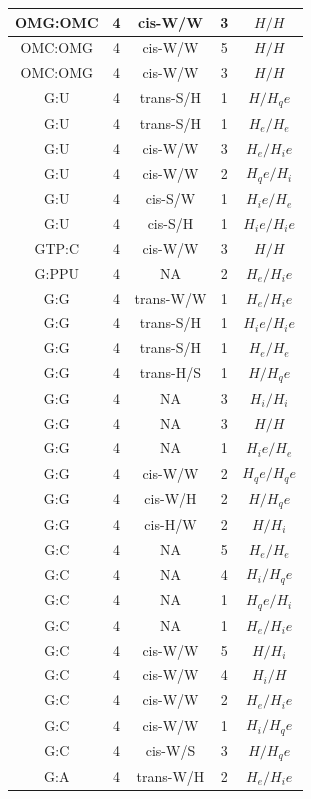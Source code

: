\begin{center}
\begin{longtable}{c|c|c|c|c}
OMG:OMC & 4 & cis-W/W & 3 & $H/H$ \\  \hline
OMC:OMG & 4 & cis-W/W & 5 & $H/H$ \\  \hline
OMC:OMG & 4 & cis-W/W & 3 & $H/H$ \\  \hline
G:U & 4 & trans-S/H & 1 & $H/H_qe$ \\  \hline
G:U & 4 & trans-S/H & 1 & $H_e/H_e$ \\  \hline
G:U & 4 & cis-W/W & 3 & $H_e/H_ie$ \\  \hline
G:U & 4 & cis-W/W & 2 & $H_qe/H_i$ \\  \hline
G:U & 4 & cis-S/W & 1 & $H_ie/H_e$ \\  \hline
G:U & 4 & cis-S/H & 1 & $H_ie/H_ie$ \\  \hline
GTP:C & 4 & cis-W/W & 3 & $H/H$ \\  \hline
G:PPU & 4 & NA & 2 & $H_e/H_ie$ \\  \hline
G:G & 4 & trans-W/W & 1 & $H_e/H_ie$ \\  \hline
G:G & 4 & trans-S/H & 1 & $H_ie/H_ie$ \\  \hline
G:G & 4 & trans-S/H & 1 & $H_e/H_e$ \\  \hline
G:G & 4 & trans-H/S & 1 & $H/H_qe$ \\  \hline
G:G & 4 & NA & 3 & $H_i/H_i$ \\  \hline
G:G & 4 & NA & 3 & $H/H$ \\  \hline
G:G & 4 & NA & 1 & $H_ie/H_e$ \\  \hline
G:G & 4 & cis-W/W & 2 & $H_qe/H_qe$ \\  \hline
G:G & 4 & cis-W/H & 2 & $H/H_qe$ \\  \hline
G:G & 4 & cis-H/W & 2 & $H/H_i$ \\  \hline
G:C & 4 & NA & 5 & $H_e/H_e$ \\  \hline
G:C & 4 & NA & 4 & $H_i/H_qe$ \\  \hline
G:C & 4 & NA & 1 & $H_qe/H_i$ \\  \hline
G:C & 4 & NA & 1 & $H_e/H_ie$ \\  \hline
G:C & 4 & cis-W/W & 5 & $H/H_i$ \\  \hline
G:C & 4 & cis-W/W & 4 & $H_i/H$ \\  \hline
G:C & 4 & cis-W/W & 2 & $H_e/H_ie$ \\  \hline
G:C & 4 & cis-W/W & 1 & $H_i/H_qe$ \\  \hline
G:C & 4 & cis-W/S & 3 & $H/H_qe$ \\  \hline
G:A & 4 & trans-W/H & 2 & $H_e/H_ie$ \\  \hline

\end{longtable}
\end{center}
